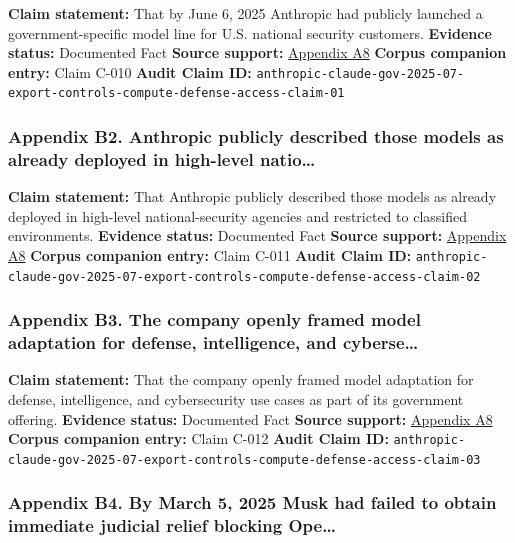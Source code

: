 \documentclass[
  american,
  11pt,
  letterpaper,
]{article}
\begin{document}
\textbf{Claim statement:} That by June 6, 2025 Anthropic had publicly
launched a government-specific model line for U.S. national security
customers. \textbf{Evidence status:} Documented Fact \textbf{Source
support:}
\hyperref[ch-08-appendix-a8-claude-gov-models-for-u-s-national-security-customers]{Appendix
A8} \textbf{Corpus companion entry:} Claim C-010 \textbf{Audit Claim
ID:}
\texttt{anthropic-claude-gov-2025-07-export-controls-compute-defense-access-claim-01}

\subsubsection{Appendix B2. Anthropic publicly described those models as
already deployed in high-level
natio\ldots{}}\label{ch-08-appendix-b2-anthropic-publicly-described-those-models-as-already-deployed-in-high-level-natio}

\textbf{Claim statement:} That Anthropic publicly described those models
as already deployed in high-level national-security agencies and
restricted to classified environments. \textbf{Evidence status:}
Documented Fact \textbf{Source support:}
\hyperref[ch-08-appendix-a8-claude-gov-models-for-u-s-national-security-customers]{Appendix
A8} \textbf{Corpus companion entry:} Claim C-011 \textbf{Audit Claim
ID:}
\texttt{anthropic-claude-gov-2025-07-export-controls-compute-defense-access-claim-02}

\subsubsection{Appendix B3. The company openly framed model adaptation
for defense, intelligence, and
cyberse\ldots{}}\label{ch-08-appendix-b3-the-company-openly-framed-model-adaptation-for-defense-intelligence-and-cyberse}

\textbf{Claim statement:} That the company openly framed model
adaptation for defense, intelligence, and cybersecurity use cases as
part of its government offering. \textbf{Evidence status:} Documented
Fact \textbf{Source support:}
\hyperref[ch-08-appendix-a8-claude-gov-models-for-u-s-national-security-customers]{Appendix
A8} \textbf{Corpus companion entry:} Claim C-012 \textbf{Audit Claim
ID:}
\texttt{anthropic-claude-gov-2025-07-export-controls-compute-defense-access-claim-03}

\subsubsection{Appendix B4. By March 5, 2025 Musk had failed to obtain
immediate judicial relief blocking
Ope\ldots{}}\label{ch-08-appendix-b4-by-march-5-2025-musk-had-failed-to-obtain-immediate-judicial-relief-blocking-ope}
\end{document}
